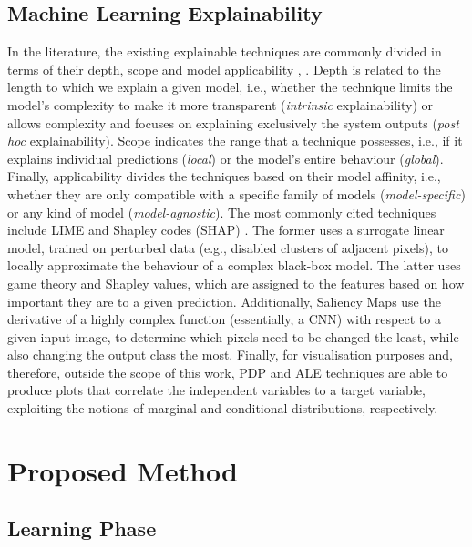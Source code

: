\documentclass[final]{cvpr}
\begin{document}
\subsection{Machine Learning Explainability}
\label{subsec:machine_learning_explainability}

In the literature, the existing explainable techniques are commonly divided in terms of their depth, scope and model applicability \cite{mythos_of_model_interpretability}, \cite{molnar2019}. Depth is related to the length to which we explain a given model, i.e., whether the technique limits the model's complexity to make it more transparent (\textit{intrinsic} explainability) or allows complexity and focuses on explaining exclusively the system outputs (\textit{post hoc} explainability). Scope indicates the range that a technique possesses, i.e., if it explains individual predictions (\textit{local}) or the model's entire behaviour (\textit{global}). Finally, applicability divides the techniques based on their model affinity, i.e., whether they are only compatible with a specific family of models (\textit{model-specific}) or any kind of model (\textit{model-agnostic}). The most commonly cited techniques include LIME \cite{lime} and Shapley codes (SHAP) \cite{shap}. The former uses a surrogate linear model, trained on perturbed data (e.g., disabled clusters of adjacent pixels), to locally approximate the behaviour of a complex black-box model. The latter uses game theory and Shapley values, which are assigned to the features based on how important they are to a given prediction. Additionally, Saliency Maps \cite{saliency_maps} use the derivative of a highly complex function (essentially, a CNN) with respect to a given input image, to determine which pixels need to be changed the least, while also changing the output class the most. Finally, for visualisation purposes and, therefore, outside the scope of this work, PDP \cite{pdp} and ALE \cite{ale} techniques are able to produce plots that correlate the independent variables to a target variable, exploiting the notions of marginal and conditional distributions, respectively.


\section{Proposed Method}
\label{sec:proposed_method}

\subsection{Learning Phase}
\label{subsec:learning_phase}
\end{document}
